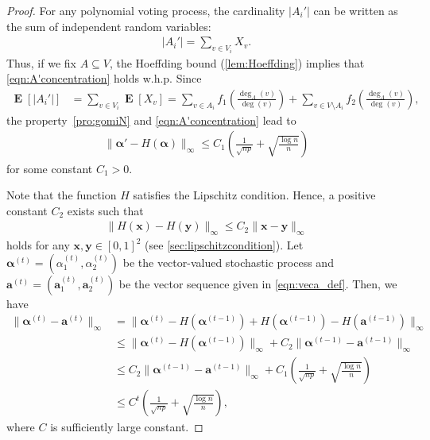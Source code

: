 \documentclass[letterpaper,11pt]{article}
\DeclareMathOperator{\E}{\mathbf{E}}
\begin{document}
\begin{proof}%
For any polynomial voting process, the cardinality $|A_i'|$ can be written as the sum of independent random variables:
\begin{align*}
|A_i'|=\sum_{v\in V_i}X_v.
\end{align*}
Thus, if we fix $A\subseteq V$, the Hoeffding bound (\cref{lem:Hoeffding}) implies that \cref{eqn:A'concentration} holds w.h.p.
Since
\begin{align*}
\E[|A_i'|]
&=\sum_{v\in V_i}\E[X_v]
=\sum_{v\in A_i}f_1\left(\frac{\deg_A(v)}{\deg(v)}\right)+\sum_{v\in V\setminus A_i}f_2\left(\frac{\deg_A(v)}{\deg(v)}\right), 
\end{align*}
the property~\ref{pro:gomiN} and \cref{eqn:A'concentration} lead to
\begin{align*}
\| {\boldsymbol \alpha'}- H({\boldsymbol \alpha}) \|_\infty \leq C_1\left(\frac{1}{\sqrt{np}}+\sqrt{\frac{\log n}{n}}\right)
\end{align*}
for some constant $C_1>0$.

Note that the function $H$ satisfies the Lipschitz condition.
Hence, a positive constant $C_2$ exists such that
\begin{align*}
\|H(\mathbf{x})-H(\mathbf{y})\|_\infty \leq C_2 \|\mathbf{x}-\mathbf{y}\|_\infty
\end{align*}
holds for any $\mathbf{x},\mathbf{y}\in[0,1]^2$ (see \cref{sec:lipschitzcondition}).
Let ${\boldsymbol \alpha}^{(t)}=(\alpha^{(t)}_1,\alpha^{(t)}_2)$ be the vector-valued stochastic process and $\mathbf{a}^{(t)}=(\mathbf{a}^{(t)}_1,\mathbf{a}^{(t)}_2)$ be the vector sequence given in \cref{eqn:veca_def}.
Then, we have
\begin{align*}
\|{\boldsymbol \alpha}^{(t)}-\mathbf{a}^{(t)}\|_\infty&=
\|{\boldsymbol \alpha}^{(t)} - H({\boldsymbol \alpha}^{(t-1)}) + H({\boldsymbol \alpha}^{(t-1)}) - H(\mathbf{a}^{(t-1)}) \|_\infty \\
&\leq
\|{\boldsymbol \alpha}^{(t)} - H({\boldsymbol \alpha}^{(t-1)}) \|_\infty + C_2\|{\boldsymbol \alpha}^{(t-1)} - \mathbf{a}^{(t-1)} \|_\infty \\
&\leq
C_2\|{\boldsymbol \alpha}^{(t-1)} - \mathbf{a}^{(t-1)} \|_\infty + C_1\left(\frac{1}{\sqrt{np}}+\sqrt{\frac{\log n}{n}}\right) \\
&\leq C^t\left(\frac{1}{\sqrt{np}}+\sqrt{\frac{\log n}{n}}\right),
\end{align*}
where $C$ is sufficiently large constant.
\end{proof}
\end{document}
